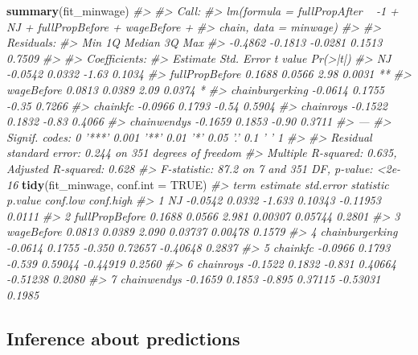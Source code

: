 \documentclass[]{book}
\newenvironment{Shaded}{\begin{snugshade}}{\end{snugshade}}
\newcommand{\KeywordTok}[1]{\textcolor[rgb]{0.13,0.29,0.53}{\textbf{#1}}}
\newcommand{\DataTypeTok}[1]{\textcolor[rgb]{0.13,0.29,0.53}{#1}}
\newcommand{\CommentTok}[1]{\textcolor[rgb]{0.56,0.35,0.01}{\textit{#1}}}
\newcommand{\OtherTok}[1]{\textcolor[rgb]{0.56,0.35,0.01}{#1}}
\newcommand{\NormalTok}[1]{#1}
\theoremstyle{definition}
\theoremstyle{definition}
\theoremstyle{definition}
\theoremstyle{remark}
\begin{document}
\begin{Shaded}
\begin{Highlighting}[]
\KeywordTok{summary}\NormalTok{(fit_minwage)}
\CommentTok{#> }
\CommentTok{#> Call:}
\CommentTok{#> lm(formula = fullPropAfter ~ -1 + NJ + fullPropBefore + wageBefore + }
\CommentTok{#>     chain, data = minwage)}
\CommentTok{#> }
\CommentTok{#> Residuals:}
\CommentTok{#>     Min      1Q  Median      3Q     Max }
\CommentTok{#> -0.4862 -0.1813 -0.0281  0.1513  0.7509 }
\CommentTok{#> }
\CommentTok{#> Coefficients:}
\CommentTok{#>                 Estimate Std. Error t value Pr(>|t|)   }
\CommentTok{#> NJ               -0.0542     0.0332   -1.63   0.1034   }
\CommentTok{#> fullPropBefore    0.1688     0.0566    2.98   0.0031 **}
\CommentTok{#> wageBefore        0.0813     0.0389    2.09   0.0374 * }
\CommentTok{#> chainburgerking  -0.0614     0.1755   -0.35   0.7266   }
\CommentTok{#> chainkfc         -0.0966     0.1793   -0.54   0.5904   }
\CommentTok{#> chainroys        -0.1522     0.1832   -0.83   0.4066   }
\CommentTok{#> chainwendys      -0.1659     0.1853   -0.90   0.3711   }
\CommentTok{#> ---}
\CommentTok{#> Signif. codes:  0 '***' 0.001 '**' 0.01 '*' 0.05 '.' 0.1 ' ' 1}
\CommentTok{#> }
\CommentTok{#> Residual standard error: 0.244 on 351 degrees of freedom}
\CommentTok{#> Multiple R-squared:  0.635,  Adjusted R-squared:  0.628 }
\CommentTok{#> F-statistic: 87.2 on 7 and 351 DF,  p-value: <2e-16}
\KeywordTok{tidy}\NormalTok{(fit_minwage, }\DataTypeTok{conf.int =} \OtherTok{TRUE}\NormalTok{)}
\CommentTok{#>              term estimate std.error statistic p.value conf.low conf.high}
\CommentTok{#> 1              NJ  -0.0542    0.0332    -1.633 0.10343 -0.11953    0.0111}
\CommentTok{#> 2  fullPropBefore   0.1688    0.0566     2.981 0.00307  0.05744    0.2801}
\CommentTok{#> 3      wageBefore   0.0813    0.0389     2.090 0.03737  0.00478    0.1579}
\CommentTok{#> 4 chainburgerking  -0.0614    0.1755    -0.350 0.72657 -0.40648    0.2837}
\CommentTok{#> 5        chainkfc  -0.0966    0.1793    -0.539 0.59044 -0.44919    0.2560}
\CommentTok{#> 6       chainroys  -0.1522    0.1832    -0.831 0.40664 -0.51238    0.2080}
\CommentTok{#> 7     chainwendys  -0.1659    0.1853    -0.895 0.37115 -0.53031    0.1985}
\end{Highlighting}
\end{Shaded}

\subsection{Inference about
predictions}\label{inference-about-predictions}
\end{document}
